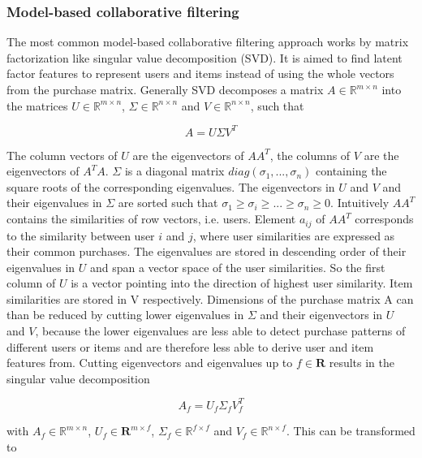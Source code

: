 \documentclass[10pt]{reportMaster}
\begin{document}
\subsubsection{Model-based collaborative filtering}
\label{sec:modelBasedCF}
The most common model-based collaborative filtering approach works by matrix factorization like singular value decomposition (SVD).
It is aimed to find latent factor features to represent users and items instead of using the whole vectors from the purchase matrix.
Generally SVD decomposes a matrix $A \in \mathds{R}^{m \times n}$ into the matrices $U \in \mathds{R}^{m \times n}$, $\Sigma \in \mathds{R}^{n \times n}$ and $V \in \mathds{R}^{n \times n}$, such that 

\begin{equation}
	A = U \Sigma V^T
\end{equation}

The column vectors of $U$ are the eigenvectors of $AA^T$, the columns of $V$ are the eigenvectors of $A^TA$.
$\Sigma$ is a diagonal matrix $diag(\sigma_1, ..., \sigma_n)$ containing the square roots of the corresponding eigenvalues.  %
The eigenvectors in $U$ and $V$ and their eigenvalues in $\Sigma$ are sorted such that $\sigma_1 \geq \sigma_i \geq ... \geq \sigma_n \geq 0$.
Intuitively $AA^T$ contains the similarities of row vectors, i.e. users.
Element $a_{ij}$ of $AA^T$ corresponds to the similarity between user $i$ and $j$, where user similarities are expressed as their common purchases.
The eigenvalues are stored in descending order of their eigenvalues in $U$ and span a vector space of the user similarities.
So the first column of $U$ is a vector pointing into the direction of highest user similarity. %
Item similarities are stored in V respectively.
Dimensions of the purchase matrix A can than be reduced by cutting lower eigenvalues in $\Sigma$ and their eigenvectors in $U$ and $V$, because the lower eigenvalues are less able to detect purchase patterns of different users or items and are therefore less able to derive user and item features from.
Cutting eigenvectors and eigenvalues up to $f \in \mathbf{R}$ results in the singular value decomposition 

\begin{equation}
	A_f = U_f \Sigma_f V_f^T
\end{equation}

with $A_f \in \mathds{R}^{m \times n}$, $U_f \in \mathbf{R}^{m \times f}$, $\Sigma_f \in \mathds{R}^{f \times f}$ and $V_f \in \mathds{R}^{n \times f}$.
This can be transformed to 
\end{document}

